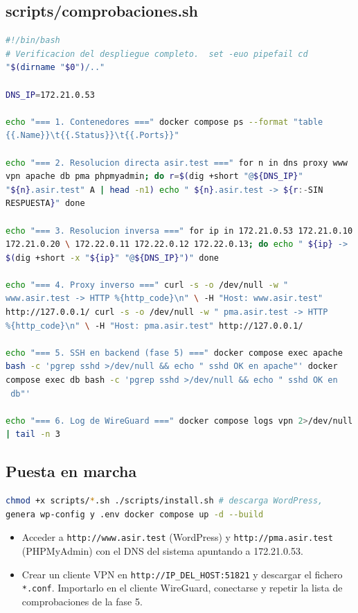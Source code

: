 \documentclass[11pt]{article}
\begin{document}
\subsection{scripts/comprobaciones.sh}
\label{sec:org000009c}

\begin{lstlisting}[language=bash,numbers=none]
#!/bin/bash
# Verificacion del despliegue completo.  set -euo pipefail cd
"$(dirname "$0")/.."

DNS_IP=172.21.0.53

echo "=== 1. Contenedores ===" docker compose ps --format "table
{{.Name}}\t{{.Status}}\t{{.Ports}}"

echo "=== 2. Resolucion directa asir.test ===" for n in dns proxy www
vpn apache db pma phpmyadmin; do r=$(dig +short "@${DNS_IP}"
"${n}.asir.test" A | head -n1) echo " ${n}.asir.test -> ${r:-SIN
RESPUESTA}" done

echo "=== 3. Resolucion inversa ===" for ip in 172.21.0.53 172.21.0.10
172.21.0.20 \ 172.22.0.11 172.22.0.12 172.22.0.13; do echo " ${ip} ->
$(dig +short -x "${ip}" "@${DNS_IP}")" done

echo "=== 4. Proxy inverso ===" curl -s -o /dev/null -w "
www.asir.test -> HTTP %{http_code}\n" \ -H "Host: www.asir.test"
http://127.0.0.1/ curl -s -o /dev/null -w " pma.asir.test -> HTTP
%{http_code}\n" \ -H "Host: pma.asir.test" http://127.0.0.1/

echo "=== 5. SSH en backend (fase 5) ===" docker compose exec apache
bash -c 'pgrep sshd >/dev/null && echo " sshd OK en apache"' docker
compose exec db bash -c 'pgrep sshd >/dev/null && echo " sshd OK en
 db"'

echo "=== 6. Log de WireGuard ===" docker compose logs vpn 2>/dev/null
| tail -n 3
\end{lstlisting}
\subsection{Puesta en marcha}
\label{sec:org000009f}

\begin{lstlisting}[language=bash,numbers=none]
chmod +x scripts/*.sh ./scripts/install.sh # descarga WordPress,
genera wp-config y .env docker compose up -d --build
\end{lstlisting}

\begin{itemize}
\item Acceder a \texttt{http://www.asir.test} (WordPress) y \texttt{http://pma.asir.test} (PHPMyAdmin) con el DNS del sistema apuntando a 172.21.0.53.
\item Crear un cliente VPN en \texttt{http://IP\_DEL\_HOST:51821} y descargar el fichero \texttt{*.conf}. Importarlo en el cliente WireGuard, conectarse y repetir la lista de comprobaciones de la fase 5.
\end{itemize}
\end{document}
